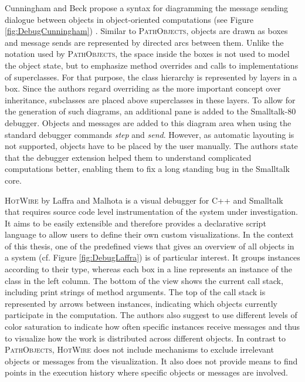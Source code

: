 Cunningham and Beck propose a syntax for diagramming the message sending dialogue between objects in object-oriented computations (see Figure \ref{fig:DebugCunningham}) \cite{cunningham_diagram_1986}.
Similar to \textsc{PathObjects}, objects are drawn as boxes and message sends are represented by directed arcs between them.
Unlike the notation used by \textsc{PathObjects}, the space inside the boxes is not used to model the object state, but to emphasize method overrides and calls to implementations of superclasses.
For that purpose, the class hierarchy is represented by layers in a box.
Since the authors regard overriding as the more important concept over inheritance, subclasses are placed above superclasses in these layers. 
To allow for the generation of such diagrams, an additional pane is added to the Smalltalk-80 debugger. 
Objects and messages are added to this diagram area when using the standard debugger commands \emph{step} and \emph{send}. 
However, as automatic layouting is not supported, objects have to be placed by the user manually. 
The authors state that the debugger extension helped them to understand complicated computations better, enabling them to fix a long standing bug in the Smalltalk core.

\textsc{HotWire} by Laffra and Malhota \cite{laffra_hotwire:_1994} is a visual debugger for C++ and Smalltalk that requires source code level instrumentation of the system under investigation.
It aims to be easily extensible and therefore provides a declarative script language to allow users to define their own custom visualizations.
In the context of this thesis, one of the predefined views that gives an overview of all objects in a system (cf. Figure \ref{fig:DebugLaffra}) is of particular interest.
It groups instances according to their type, whereas each box in a line represents an instance of the class in the left column.
The bottom of the view shows the current call stack, including print strings of method arguments.
The top of the call stack is represented by arrows between instances, indicating which objects currently participate in the computation.
The authors also suggest to use different levels of color saturation to indicate how often specific instances receive messages and thus to visualize how the work is distributed across different objects.
In contrast to \textsc{PathObjects}, \textsc{HotWire} does not include mechanisms to exclude irrelevant objects or messages from the visualization.
It also does not provide means to find points in the execution history where specific objects or messages are involved.


